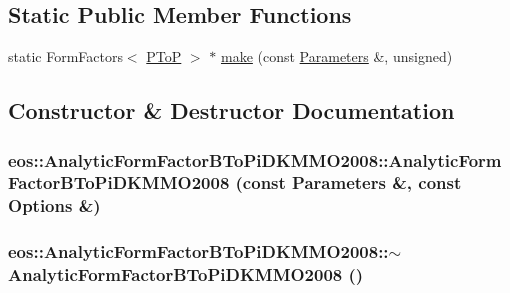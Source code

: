 \subsection*{Static Public Member Functions}
\begin{DoxyCompactItemize}
\item 
static FormFactors$<$ \hyperlink{structeos_1_1PToP}{PToP} $>$ $\ast$ \hyperlink{classeos_1_1AnalyticFormFactorBToPiDKMMO2008_aff2cc738d3c04dee5e593ef6e40d84e3}{make} (const \hyperlink{classeos_1_1Parameters}{Parameters} \&, unsigned)
\end{DoxyCompactItemize}


\subsection{Constructor \& Destructor Documentation}
\hypertarget{classeos_1_1AnalyticFormFactorBToPiDKMMO2008_aee4ce0fc9eb6b6dbb95ccb80b59c0aa3}{
\subsubsection[{AnalyticFormFactorBToPiDKMMO2008}]{\setlength{\rightskip}{0pt plus 5cm}eos::AnalyticFormFactorBToPiDKMMO2008::AnalyticFormFactorBToPiDKMMO2008 (const {\bf Parameters} \&, \/  const {\bf Options} \&)}}
\label{classeos_1_1AnalyticFormFactorBToPiDKMMO2008_aee4ce0fc9eb6b6dbb95ccb80b59c0aa3}
\hypertarget{classeos_1_1AnalyticFormFactorBToPiDKMMO2008_afdb28ecd4ce74296cb8b4e99af7819dd}{
\subsubsection[{$\sim$AnalyticFormFactorBToPiDKMMO2008}]{\setlength{\rightskip}{0pt plus 5cm}eos::AnalyticFormFactorBToPiDKMMO2008::$\sim$AnalyticFormFactorBToPiDKMMO2008 ()}}
\label{classeos_1_1AnalyticFormFactorBToPiDKMMO2008_afdb28ecd4ce74296cb8b4e99af7819dd}


